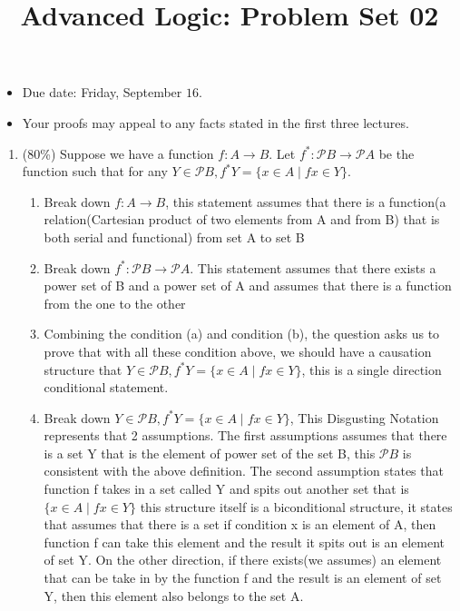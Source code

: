 \documentclass[10pt]{article}
\title{Advanced Logic: Problem Set 02 }
\author{}
\date{}
\begin{document}
\maketitle
\begin{itemize}
  \item Due date: Friday, September $16 .$

  \item Your proofs may appeal to any facts stated in the first three lectures.

\end{itemize}
\begin{enumerate}
  \item (80\%) Suppose we have a function $f: A \rightarrow B$. Let $f^{*}: \mathscr{P} B \rightarrow \mathscr{P} A$ be the function such that for any $Y \in \mathscr{P} B, f^{*} Y=\{x \in A \mid f x \in Y\}$.
  \begin{enumerate}
    \item Break down $f: A \rightarrow B$, this statement assumes that there is a function(a relation(Cartesian product of two elements from A and from B) that is both serial and functional) from set A to set B 
    \item Break down $f^{*}: \mathscr{P} B \rightarrow \mathscr{P} A$. This statement assumes that there exists a power set of B and a power set of A and assumes that there is a function from the one to the other
    \item Combining the condition (a) and condition (b), the question asks us to prove that with all these condition above, we should have a causation structure that $Y \in \mathscr{P} B, f^{*} Y=\{x \in A \mid f x \in Y\}$, this is a single direction conditional statement. 
    \item Break down $Y \in \mathscr{P} B, f^{*} Y=\{x \in A \mid f x \in Y\}$, 
    This Disgusting Notation represents that 2 assumptions. 
    The first assumptions assumes that there is a set Y that
    is the element of power set of the set B, this
    $\mathscr{P} B$ is consistent with the above 
    definition. The second assumption states that function f takes in a set called Y and spits out another set that is $\{x \in A \mid f x \in Y\}$ this structure itself is a biconditional structure, it states that assumes that there is a set if condition x is an element of A, then function f can take this element and the result it spits out is an element of set Y. On the other direction, if there exists(we assumes) an element that can be take in by the function f and the result is an element of set Y, then this element also belongs to the set A.



\end{enumerate}
\end{enumerate}
\end{document}
